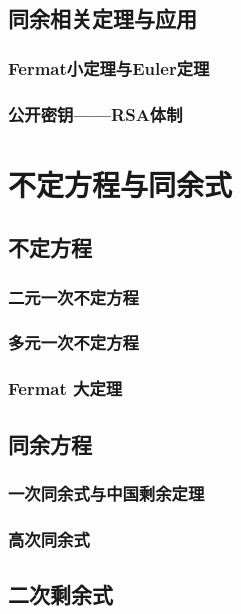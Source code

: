\section{同余相关定理与应用}
\subsection{Fermat小定理与Euler定理}
\clearpage
\subsection{公开密钥——RSA体制}
\clearpage


\chapter{不定方程与同余式}
\section{不定方程}
\subsection{二元一次不定方程}
\clearpage
\subsection{多元一次不定方程}
\clearpage
\subsection{Fermat 大定理}
\clearpage


\section{同余方程}
\subsection{一次同余式与中国剩余定理}
\clearpage
\subsection{高次同余式}
\clearpage



\section{二次剩余式}
